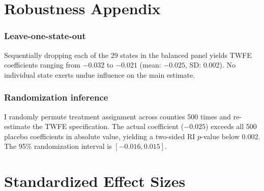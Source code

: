 \documentclass[12pt]{article}
\begin{document}
\section{Robustness Appendix}

\subsubsection*{Leave-one-state-out} Sequentially dropping each of the 29 states in the balanced panel yields TWFE coefficients ranging from $-0.032$ to $-0.021$ (mean: $-0.025$, SD: 0.002). No individual state exerts undue influence on the main estimate.

\subsubsection*{Randomization inference} I randomly permute treatment assignment across counties 500 times and re-estimate the TWFE specification. The actual coefficient ($-0.025$) exceeds all 500 placebo coefficients in absolute value, yielding a two-sided RI $p$-value below 0.002. The 95\% randomization interval is $[-0.016, 0.015]$.


\section{Standardized Effect Sizes}
\label{sec:sde}


\end{document}
